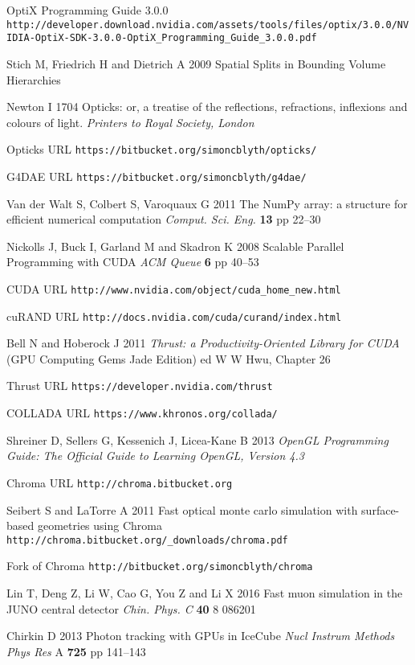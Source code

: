 \documentclass[a4paper]{jpconf}
\begin{document}
\begin{thebibliography}{9}
OptiX Programming Guide 3.0.0 {\tt http://developer.download.nvidia.com/assets/tools/files/optix/3.0.0/NVIDIA-OptiX-SDK-3.0.0-OptiX\_Programming\_Guide\_3.0.0.pdf}

Stich M, Friedrich H and Dietrich A 
2009
Spatial Splits in Bounding Volume Hierarchies


Newton I 
1704 
Opticks: or, a treatise of the reflections, refractions, inflexions and colours of light.
{\it Printers to Royal Society, London} 

Opticks URL {\tt https://bitbucket.org/simoncblyth/opticks/}

G4DAE URL {\tt https://bitbucket.org/simoncblyth/g4dae/}

Van der Walt S, Colbert S, Varoquaux G 
2011 
The NumPy array: a structure for efficient numerical computation
{\it Comput. Sci. Eng.} {\bf 13} pp 22--30

Nickolls J, Buck I, Garland M and Skadron K 
2008
Scalable Parallel Programming with CUDA
{\it ACM Queue} {\bf 6} pp 40--53

CUDA URL {\tt http://www.nvidia.com/object/cuda\_home\_new.html}

cuRAND URL {\tt http://docs.nvidia.com/cuda/curand/index.html}


Bell N and Hoberock J 
2011
{\it Thrust: a Productivity-Oriented Library for CUDA}
(GPU Computing Gems Jade Edition) ed W W Hwu, Chapter 26   

Thrust URL {\tt https://developer.nvidia.com/thrust}

COLLADA URL {\tt https://www.khronos.org/collada/}

Shreiner D, Sellers G, Kessenich J, Licea-Kane B 
2013
{\it OpenGL Programming Guide: The Official Guide to Learning OpenGL, Version 4.3}


Chroma URL {\tt http://chroma.bitbucket.org}

Seibert S and LaTorre A 
2011 
Fast optical monte carlo simulation with surface-based geometries using Chroma {\tt http://chroma.bitbucket.org/\_downloads/chroma.pdf}

Fork of Chroma {\tt http://bitbucket.org/simoncblyth/chroma}

Lin T, Deng Z, Li W, Cao G, You Z and Li X
2016
Fast muon simulation in the JUNO central detector
{\it Chin. Phys. C} {\bf 40} 8 086201

Chirkin D
2013
Photon tracking with GPUs in IceCube
{\it Nucl Instrum Methods Phys Res} A {\bf 725} pp 141--143



\end{thebibliography}
\end{document}
